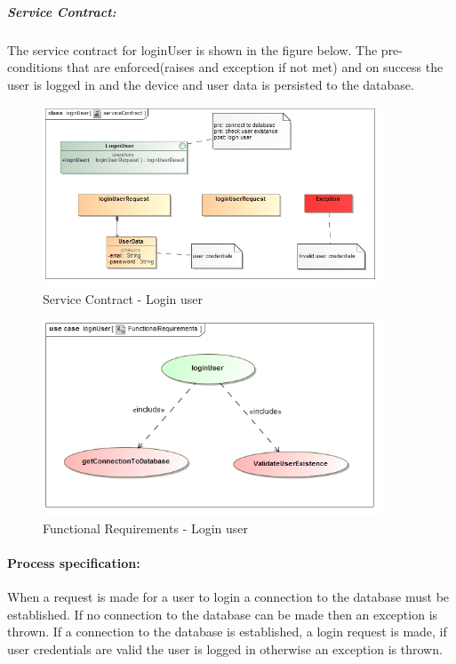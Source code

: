 \documentclass[hidelinks, 12pt, oneside]{article}
\begin{document}
	\subparagraph{Service Contract:}
		The service contract for loginUser is shown in the figure below. The pre-conditions that are enforced(raises and exception if not met) and on success the user is logged in and the device and user data is persisted to the database.\newline 	
	
		\begin{figure}[!htbp]
    		\centering
    		\includegraphics[width=0.9\textwidth]{img/serviceContractLoginUser.jpg}
    		\caption{Service Contract - Login user}
    		\label{fig:ServiceCon_loginUser}
		\end{figure}
		
		
		\begin{figure}[!htbp]
    		\centering
    		\includegraphics[width=0.9\textwidth]{img/functionalRequirementsLoginUser.jpg}
    		\caption{Functional Requirements - Login user}
    		\label{fig:FunctionalReq_loginUser}
		\end{figure}
		
				
		\newpage
		\paragraph{Process specification:}
		When a request is made for a user to login a connection to the database must be established. If no connection to the database can be made then an exception is thrown. If a connection to the database is established, a login request is made, if user credentials are valid	the user is logged in otherwise an exception is thrown.		
		
\end{document}
